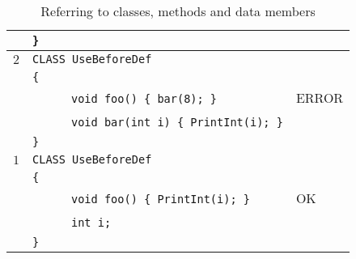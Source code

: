 \documentclass{article}
\begin{document}
\begin{table}[h]
\begin{tabular}{|l|l|l|}
     & \verb"}"                                  &       \\
\hline
 $2$ & \verb"CLASS UseBeforeDef"                      &       \\
     & \verb"{"                                       &       \\
     & ~ ~ ~ ~\verb"void foo() { bar(8); }"           & ERROR \\
     & ~ ~ ~ ~\verb"void bar(int i) { PrintInt(i); }" &       \\
     & \verb"}"                                       &       \\
\hline
 $1$ & \verb"CLASS UseBeforeDef"                 &    \\
     & \verb"{"                                  &    \\
     & ~ ~ ~ ~\verb"void foo() { PrintInt(i); }" & OK \\
     & ~ ~ ~ ~\verb"int i;"                      &    \\
     & \verb"}"                                  &    \\
\hline
\end{tabular}
\caption{Referring to classes, methods and data members
\label{Table_Code_Examples_Use_Before_Def}}
\end{table}
\end{document}
